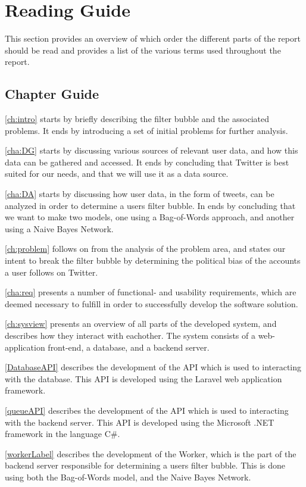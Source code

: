 \section{Reading Guide}\label{sec:readingGuide}
This section provides an overview of which order the different parts of the
report should be read and provides a list of the various terms used throughout
the report.

\subsection{Chapter Guide}
\autoref{ch:intro} starts by briefly describing the filter bubble and
the associated problems. It ends by introducing a set of initial problems for
further analysis.\nl

\autoref{cha:DG} starts by discussing various sources of relevant user
data, and how this data can be gathered and accessed. It ends by concluding that
Twitter is best suited for our needs, and that we will use it as a data
source.\nl

\autoref{cha:DA} starts by discussing how user data, in the form of tweets, can
be analyzed in order to determine a users filter bubble. In ends by concluding
that we want to make two models, one using a Bag-of-Words approach, and another
using a Naive Bayes Network.\nl

\autoref{ch:problem} follows on from the analysis of the problem area, and
states our intent to break the filter bubble by determining the political bias
of the accounts a user follows on Twitter.\nl

\autoref{cha:req} presents a number of functional- and usability requirements,
which are deemed necessary to fulfill in order to successfully develop the
software solution.\nl

\autoref{ch:sysview} presents an overview of all parts of the developed system,
and describes how they interact with eachother. The system consists of a
web-application front-end, a database, and a backend server.\nl

\autoref{DatabaseAPI} describes the development of the API which is used to
interacting with the database. This API is developed using the Laravel web
application framework.\nl

\autoref{queueAPI} describes the development of the API which is used to
interacting with the backend server. This API is developed using the Microsoft
.NET framework in the language C\#.\nl

\autoref{workerLabel} describes the development of the Worker, which is the part
of the backend server responsible for determining a users filter bubble. This is
done using both the Bag-of-Words model, and the Naive Bayes Network.\nl

